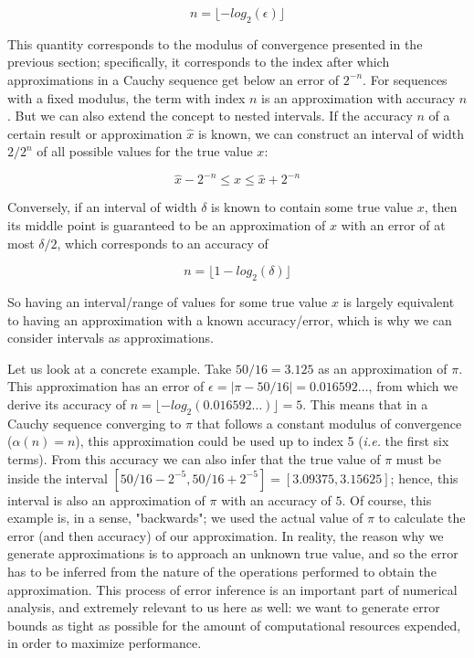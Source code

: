 \begin{equation}
\label{eq:accuracy}
  n = \lfloor-log_2(\epsilon)\rfloor
\end{equation}

This quantity corresponds to the modulus of convergence presented in the previous section; specifically, it corresponds to the index after which approximations in a Cauchy sequence get below an error of $2^{-n}$. For sequences with a fixed modulus, the term with index $n$ is an approximation with accuracy $n$. But we can also extend the concept to nested intervals. If the accuracy $n$ of a certain result or approximation $\hat{x}$ is known, we can construct an interval of width $2/2^n$ of all possible values for the true value $x$:

\begin{equation*}
\hat{x}-2^{-n} \leq x \leq \hat{x}+2^{-n}
\end{equation*}

Conversely, if an interval of width $\delta$ is known to contain some true value $x$, then its middle point is guaranteed to be an approximation of $x$ with an error of at most $\delta/2$, which corresponds to an accuracy of

\begin{equation}
\label{eq:accuracy_delta}
  n = \lfloor 1 - log_2(\delta)\rfloor
\end{equation}

So having an interval/range of values for some true value $x$ is largely equivalent to having an approximation with a known accuracy/error, which is why we can consider intervals as approximations.

Let us look at a concrete example. Take $50/16=3.125$ as an approximation of $\pi$. This approximation has an error of $\epsilon = |\pi-50/16| = 0.016592\dots$, from which we derive its accuracy of $n=\lfloor-log_2(0.016592\dots)\rfloor = 5$. This means that in a Cauchy sequence converging to $\pi$ that follows a constant modulus of convergence ($\alpha(n)=n$), this approximation could be used up to index 5 (\textit{i.e.} the first six terms). From this accuracy we can also infer that the true value of $\pi$ must be inside the interval $[50/16 - 2^{-5}, 50/16 + 2^{-5}] = [3.09375, 3.15625]$; hence, this interval is also an approximation of $\pi$ with an accuracy of $5$. Of course, this example is, in a sense, "backwards"; we used the actual value of $\pi$ to calculate the error (and then accuracy) of our approximation. In reality, the reason why we generate approximations is to approach an unknown true value, and so the error has to be inferred from the nature of the operations performed to obtain the approximation. This process of error inference is an important part of numerical analysis, and extremely relevant to us here as well: we want to generate error bounds as tight as possible for the amount of computational resources expended, in order to maximize performance.

